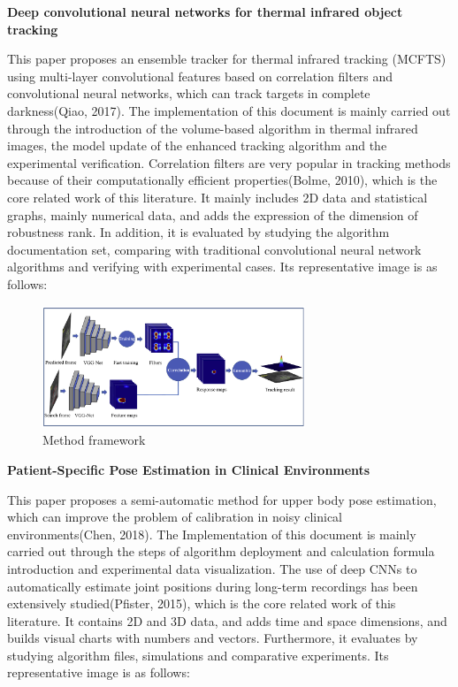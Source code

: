 \documentclass[12pt]{article}
\begin{document}
\noindent \textbf{Deep convolutional neural networks for thermal infrared object tracking}

\noindent This paper proposes an ensemble tracker for thermal infrared tracking (MCFTS) using multi-layer convolutional features based on correlation filters and convolutional neural networks, which can track targets in complete darkness(Qiao, 2017). The implementation of this document is mainly carried out through the introduction of the volume-based algorithm in thermal infrared images, the model update of the enhanced tracking algorithm and the experimental verification. Correlation filters are very popular in tracking methods because of their computationally efficient properties(Bolme, 2010), which is the core related work of this literature. It mainly includes 2D data and statistical graphs, mainly numerical data, and adds the expression of the dimension of robustness rank. In addition, it is evaluated by studying the algorithm documentation set, comparing with traditional convolutional neural network algorithms and verifying with experimental cases. Its representative image is as follows:

\begin{figure}[H]
\centering
\includegraphics[width=0.7\textwidth]{Paper9.pic.jpg}
\caption{Method framework} 
\end{figure}

\noindent \textbf{Patient-Specific Pose Estimation in Clinical Environments}

\noindent This paper proposes a semi-automatic method for upper body pose estimation, which can improve the problem of calibration in noisy clinical environments(Chen, 2018). The Implementation of this document is mainly carried out through the steps of algorithm deployment and calculation formula introduction and experimental data visualization. The use of deep CNNs to automatically estimate joint positions during long-term recordings has been extensively studied(Pfister, 2015), which is the core related work of this literature. It contains 2D and 3D data, and adds time and space dimensions, and builds visual charts with numbers and vectors. Furthermore, it evaluates by studying algorithm files, simulations and comparative experiments. Its representative image is as follows:
\end{document}
